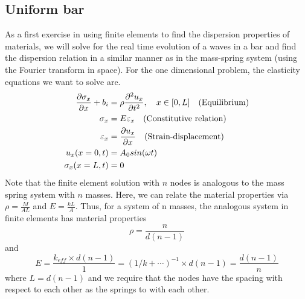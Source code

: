 \documentclass{article}
\begin{document}
\subsection{Uniform bar}
As a first exercise in using finite elements to find the dispersion properties 
of materials, we will solve for the real time evolution of a waves in a bar and 
find the dispersion relation in a similar manner as in the mass-spring system 
(using the Fourier transform in space). For the one dimensional problem, the 
elasticity equations we want to solve are.
\begin{align}
\frac{\partial \sigma_x}{\partial x} + b_i &= \rho \frac{\partial^2 
u_x}{\partial t^2},\quad x\in[0,L]\quad\textnormal{(Equilibrium)} \\
\sigma_x &= E \varepsilon_x\quad\textnormal{(Constitutive relation)}\\
\varepsilon_x &= \frac{\partial u_x}{\partial 
x}\quad\textnormal{(Strain-displacement)}\\
u_x(x=0,t) &= A_0sin(\omega t) \\
\sigma_x(x=L,t) &= 0
\end{align}
Note that the finite element solution with $n$ nodes is analogous to the mass 
spring system with $n$ masses. Here, we can relate the material properties via 
$\rho = \frac{M}{AL}$ and $E = \frac{kL}{A}$. Thus, for a system of n masses, 
the analogous system in finite elements has material properties
\begin{equation}
\rho = \frac{n}{d(n-1)}
\end{equation}
and
\begin{equation}
E = \frac{k_{eff}\times d(n-1)}{1}= (1/k +\cdots)^{-1} \times d(n-1)= 
\frac{d(n-1)}{n}
\end{equation}
where $L=d(n-1)$ and we require that the nodes have the spacing with respect to 
each other as the springs to with each other.
\end{document}
